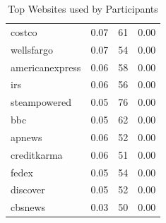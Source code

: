 \begin{table}[ht]
\begin{tabular}{lrrr}
  costco & 0.07 &  61 & 0.00 \\ 
  wellsfargo & 0.07 &  54 & 0.00 \\ 
  americanexpress & 0.06 &  58 & 0.00 \\ 
  irs & 0.06 &  56 & 0.00 \\ 
  steampowered & 0.05 &  76 & 0.00 \\ 
  bbc & 0.05 &  62 & 0.00 \\ 
  apnews & 0.06 &  52 & 0.00 \\ 
  creditkarma & 0.06 &  51 & 0.00 \\ 
  fedex & 0.05 &  54 & 0.00 \\ 
  discover & 0.05 &  52 & 0.00 \\ 
  cbsnews & 0.03 &  50 & 0.00 \\ 
   \hline
\end{tabular}
\caption{Top Websites used by Participants} 
\label{tab:top_websites}
\end{table}
